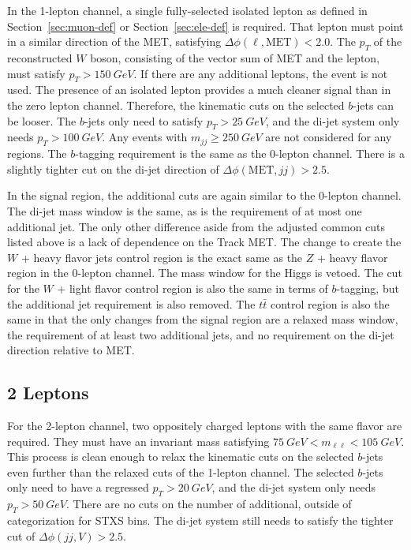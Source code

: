 In the 1-lepton channel, a single fully-selected isolated lepton as defined in
Section~\ref{sec:muon-def} or Section~\ref{sec:ele-def} is required.
That lepton must point in a similar direction of the MET,
satisfying $\Delta \phi(\ell, \mathrm{MET}) < 2.0$.
The $p_T$ of the reconstructed $W$ boson, consisting of the vector sum of MET and the lepton,
must satisfy $p_T > \SI{150}{GeV}$.
If there are any additional leptons, the event is not used.
The presence of an isolated lepton provides
a much cleaner signal than in the zero lepton channel.
Therefore, the kinematic cuts on the selected $b$-jets can be looser.
The $b$-jets only need to satisfy $p_T > \SI{25}{GeV}$,
and the di-jet system only needs $p_T > \SI{100}{GeV}$.
Any events with $m_{jj} \ge \SI{250}{GeV}$ are not considered for any regions.
The $b$-tagging requirement is the same as the 0-lepton channel.
There is a slightly tighter cut on the di-jet direction of $\Delta\phi(\mathrm{MET}, jj) > 2.5$.

In the signal region, the additional cuts are again similar to the 0-lepton channel.
The di-jet mass window is the same, as is the requirement of at most one additional jet.
The only other difference aside from the adjusted common cuts listed above
is a lack of dependence on the Track MET.
The change to create the $W$ + heavy flavor jets control region is the exact same as the
$Z$ + heavy flavor region in the 0-lepton channel.
The mass window for the Higgs is vetoed.
The cut for the $W$ + light flavor control region is also the same in terms of $b$-tagging,
but the additional jet requirement is also removed.
The $t\bar{t}$ control region is also the same in that the only changes from the signal region
are a relaxed mass window, the requirement of at least two additional jets,
and no requirement on the di-jet direction relative to MET.

\subsection{2 Leptons} \label{sec:resolved-2}

For the 2-lepton channel, two oppositely charged leptons with the same flavor are required.
They must have an invariant mass satisfying $\SI{75}{GeV} < m_{\ell\ell} < \SI{105}{GeV}$.
This process is clean enough to relax the kinematic cuts on the selected $b$-jets
even further than the relaxed cuts of the 1-lepton channel.
The selected $b$-jets only need to have a regressed $p_T > \SI{20}{GeV}$,
and the di-jet system only needs $p_T > \SI{50}{GeV}$.
There are no cuts on the number of additional, outside of categorization for STXS bins.
The di-jet system still needs to satisfy the tighter cut of $\Delta\phi(jj,V) > 2.5$.

